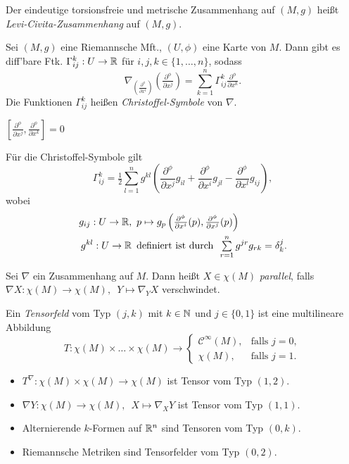 \documentclass{cheat-sheet}
\newcommand{\coord}[1]{\tfrac{\partial^\phi}{\partial x^{#1}}} %
\newcommand{\Coord}[1]{\frac{\partial^\phi}{\partial x^{#1}}} %
\newcommand{\lie}[2]{\left[ {#1}, {#2} \right]} %
\newcommand{\Cont}{\mathcal{C}} %
\begin{document}
\begin{defn}
  Der eindeutige torsionsfreie und metrische Zusammenhang auf $(M, g)$ heißt \emph{Levi-Civita-Zusammenhang} auf $(M, g)$.
\end{defn}

\begin{bem}
  Sei $(M, g)$ eine Riemannsche Mft., $(U, \phi)$ eine Karte von $M$. Dann gibt es diff'bare Ftk. $\Gamma_{ij}^k : U \to \mathbb{R}$ für $i,j,k \in \{ 1, \ldots, n \}$, sodass
  \[
    \nabla_{\left( \coord{i} \right)} \left( \coord{j} \right) = \sum_{k=1}^n \Gamma_{ij}^k \coord{k}.
  \]
  Die Funktionen $\Gamma_{ij}^k$ heißen \emph{Christoffel-Symbole} von $\nabla$.
\end{bem}


\begin{lem}
  $\lie{\coord{j}}{\coord{k}} = 0$
\end{lem}

\begin{satz}
  Für die Christoffel-Symbole gilt
  \[ \Gamma_{ij}^k = \tfrac{1}{2} \sum_{l=1}^n g^{kl} \left( \Coord{j} g_{il} + \Coord{i} g_{jl} - \Coord{l} g_{ij} \right), \]
  wobei
  \begin{align*}
    g_{ij} : U \to \R, & \enspace p \mapsto g_p \left( \coord{i} (p), \coord{j} (p) \right) \\
    g^{kl} : U \to \R & \enspace \text{definiert ist durch} \enspace \sum_{r=1}^n g^{jr} g_{rk} = \delta_k^j.
  \end{align*}
\end{satz}

\begin{defn}
  Sei $\nabla$ ein Zusammenhang auf $M$. Dann heißt $X \in \chi(M)$ \emph{parallel}, falls
  $\nabla X : \chi(M) \to \chi(M), \enspace Y \mapsto \nabla_Y X$
  verschwindet.
\end{defn}

\begin{defn}
  Ein \emph{Tensorfeld} vom Typ $(j, k)$ mit $k \in \mathbb{N}$ und $j \in \{ 0, 1 \}$ ist eine multilineare Abbildung
  \[
    T : \chi(M) \times \ldots \times \chi(M) \to
    \begin{cases}
      \Cont^\infty(M), & \text{falls } j = 0,\\
      \chi(M), & \text{falls } j = 1.
    \end{cases}
  \]
\end{defn}

\begin{bspe}
  \begin{itemize}
    \item $T^\nabla : \chi(M) \times \chi(M) \to \chi(M)$ ist Tensor vom Typ $(1, 2)$.
    \item $\nabla Y : \chi(M) \to \chi(M), \enspace X \mapsto \nabla_X Y$ ist Tensor vom Typ $(1, 1)$.
    \item Alternierende $k$-Formen auf $\mathbb{R}^n$ sind Tensoren vom Typ $(0, k)$.
    \item Riemannsche Metriken sind Tensorfelder vom Typ $(0, 2)$.
  \end{itemize}
\end{bspe}
\end{document}
